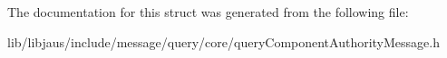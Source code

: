 \-The documentation for this struct was generated from the following file\-:\begin{DoxyCompactItemize}
\item 
lib/libjaus/include/message/query/core/query\-Component\-Authority\-Message.\-h\end{DoxyCompactItemize}
